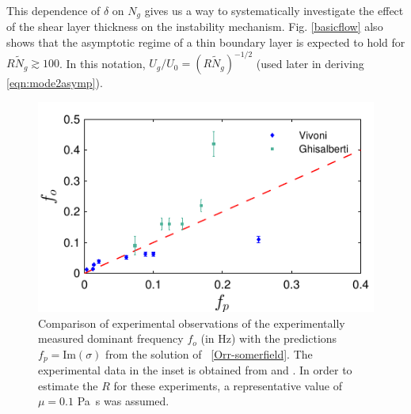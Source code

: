 \documentclass{jfm}
\renewcommand{\Rey}{{R}}
\newcommand{\Ndg}{\tilde{N}_g}
\newcommand{\ReyNdg}{{\Rey\Ndg}}
\begin{document}
This dependence of $\delta$ on $N_g$ gives us a way to systematically investigate the effect of the shear layer thickness on the instability mechanism.
Fig. \ref{basicflow} also shows that the asymptotic regime of a thin boundary layer is expected to hold for $\ReyNdg \gtrsim 100$. 
In this notation, $U_g/U_0 = (\Rey \Ndg)^{-1/2}$ (used later in deriving \eqref{eqn:mode2asymp}). 
\begin{figure}
\centerline{\includegraphics[]{new_graph_freq}}
\caption{Comparison of experimental observations of the experimentally measured dominant frequency $f_o$ (in Hz) with the predictions $f_p=\text{Im}(\sigma)$ from the solution of ~\eqref{Orr-somerfield}. 
The experimental data in the inset is obtained from \cite{Ghisal02} and \cite{Vivoni98}. 
In order to estimate the $\Rey$ for these experiments, a representative value of $\mu=0.1$ Pa~s was assumed.
}
\label{frequency_comparison}
\end{figure}
\end{document}

